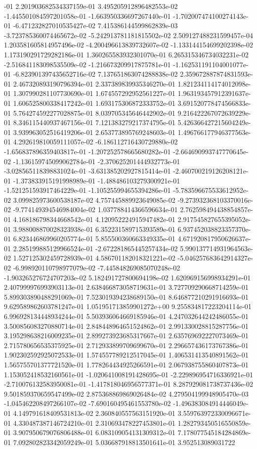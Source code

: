 -01	2.201903682534337159e-01	3.495205912896482553e-02	-1.445501084597201058e-01	-1.663950336697267440e-01	-1.702007474100274143e-01	-6.471232827010535427e-02	7.415386144599862839e-03	-3.723785360074465672e-02	-5.242913781181815502e-02	2.509127488231599457e-04	1.203581605814957496e-02	-4.200496613839732607e-02	-1.133144154699202398e-02	1.173190291729282186e-01	1.360265583932301070e-01	6.265315346734032231e-02	-2.516841183098535509e-02	-1.216673209917875781e-01	-1.162531191104001077e-01	-6.823901397435652716e-02	7.137651863074288838e-02	2.359672887874831593e-01	2.467320893190796394e-01	2.337389839935346270e-01	1.821234114174012098e-01	1.307990281107730690e-01	1.674557292952561227e-01	1.963193457912391637e-01	1.606525800338417242e-01	1.693175306872333752e-01	3.691520778474566833e-01	5.764274592277028875e-01	8.039705345646442902e-01	9.216422267072639229e-01	8.346115440937467156e-01	7.121383279217374795e-01	5.426366427215604249e-01	3.939963052516419206e-01	2.653773895769248603e-01	1.496766177946377563e-01	4.292619810059111057e-02	-6.186112716430729880e-02	-1.656837896359403817e-01	-1.207252578665680282e-01	-2.664690993747770645e-02	-1.136159745099062784e-01	-2.370625201444932773e-01	-3.028565118398831024e-01	-3.631385202927815414e-01	-2.460700219126208121e-01	-1.373833915191998989e-01	-1.488486103279300921e-01	-1.521251593917464229e-01	-1.105255994655394286e-01	-5.783596675533612952e-02	3.099825973600538187e-02	4.757445889923649085e-02	-9.273932368103370016e-02	-9.774149394546984004e-02	1.037788414366596634e-01	2.762598494438854857e-01	4.168186798344668542e-01	4.120952224915947482e-01	2.917545827655395052e-01	3.988008870028323938e-01	6.352231589715393589e-01	6.937452038823357370e-01	6.823446869960205774e-01	5.855500360663349335e-01	4.671920817950626637e-01	2.285199885129966524e-01	-2.672281865445257434e-02	5.990137714931964563e-02	1.527125302459728939e-01	4.586701182018321221e-02	-5.046257683642914327e-02	-6.998920110798977079e-02	-7.445848269085070248e-02	-1.903265276724707203e-02	5.182491727800694198e-02	1.620969156998934291e-01	2.407999976993903113e-01	2.638466873058719631e-01	3.727709290668714259e-01	5.899303890488291069e-01	7.523019394238689150e-01	8.646877210291916693e-01	9.629589862603781247e-01	1.051951713859901272e+00	9.255834817223204114e-01	6.996928134448934244e-01	5.503936064669185946e-01	4.247032644242486055e-01	3.500856083270880714e-01	2.848448964651524862e-01	2.991330028815287756e-01	3.195298638216009235e-01	2.899273923685317667e-01	2.635769692227073469e-01	2.715780656535375925e-01	2.712933899709699670e-01	2.296657436173767386e-01	1.902302592925072533e-01	1.574557789212517045e-01	1.406531413540891562e-01	1.565755701377721520e-01	1.778264434925266591e-01	2.067938755860407873e-01	1.153052418532160561e-01	-1.020641008191428695e-01	-2.229896954716336921e-01	-2.710076132583950081e-01	-1.417818046956577371e-01	8.287929081738737436e-02	9.501859370659547499e-02	2.875368869869026484e-02	4.279504199948905470e-03	-1.045462208497266107e-02	-7.690160495461553780e-02	-1.496383084914446049e-01	4.149791618409531813e-02	2.360840557563151920e-01	3.559763972330096671e-01	4.330487387146724210e-01	2.310693478227453801e-01	1.282793450516550859e-01	3.907950679076806488e-01	6.083109054131309312e-01	7.178077545184284869e-01	7.092802823342059249e-01	5.036687918813501641e-01	3.952513089031722